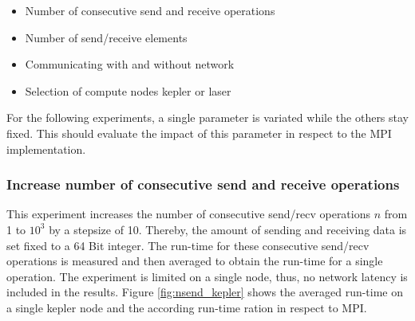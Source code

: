 \begin{itemize}
  \item Number of consecutive send and receive operations
  \item Number of send/receive elements
  \item Communicating with and without network
  \item Selection of compute nodes kepler or laser
\end{itemize}

For the following experiments, a single parameter is variated while
the others stay fixed. This should evaluate the impact of this
parameter in respect to the MPI implementation.

\subsubsection*{Increase number of consecutive send and receive operations}
This experiment increases the number of consecutive send/recv
operations $n$ from 1 to $10^3$ by a stepsize of 10. Thereby, the amount of
sending and receiving data is set fixed to a 64 Bit integer.  The
run-time for these consecutive send/recv operations is measured and
then averaged to obtain the run-time for a single operation.  The
experiment is limited on a single node, thus, no network latency is
included in the results.  Figure \ref{fig:nsend_kepler} shows the
averaged run-time on a single kepler node and the according run-time
ration in respect to MPI.

